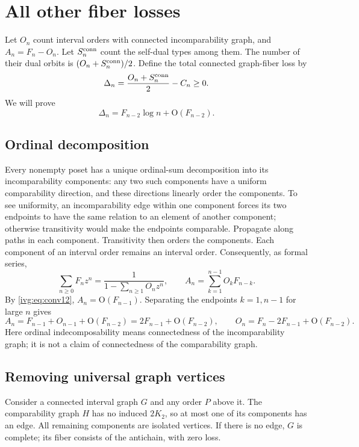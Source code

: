 \documentclass[11pt,letterpaper]{article}
\theoremstyle{definition}\newtheorem{definition}[theorem]{Definition}
\theoremstyle{remark}\newtheorem{remark}[theorem]{Remark}
\newcommand{\OO}{\mathrm O}
\begin{document}
\section{All other fiber losses}\label{ivg:sec:loss}
Let $O_n$ count interval orders with connected incomparability graph, and $A_n=F_n-O_n$. Let $S_n^{\rm conn}$ count the self-dual types among them. The number of their dual orbits is $(O_n+S_n^{\rm conn})/2$. Define the total connected graph-fiber loss by
\begin{equation}\label{ivg:eq:Delta}
 \Delta_n=\frac{O_n+S_n^{\rm conn}}2-C_n\ge0.
\end{equation}
We will prove
\begin{equation}\label{ivg:eq:lossmain}
 \Delta_n=F_{n-2}\log n+\OO(F_{n-2}).
\end{equation}

\subsection{Ordinal decomposition}
Every nonempty poset has a unique ordinal-sum decomposition into its incomparability components: any two such components have a uniform comparability direction, and these directions linearly order the components. To see uniformity, an incomparability edge within one component forces its two endpoints to have the same relation to an element of another component; otherwise transitivity would make the endpoints comparable. Propagate along paths in each component. Transitivity then orders the components. Each component of an interval order remains an interval order. Consequently, as formal series,
\begin{equation}\label{ivg:eq:ordinal}
 \sum_{n\ge0}F_nz^n=\frac1{1-\sum_{n\ge1}O_nz^n},\qquad
 A_n=\sum_{k=1}^{n-1}O_kF_{n-k}.
\end{equation}
By \eqref{ivg:eq:conv12}, $A_n=\OO(F_{n-1})$. Separating the endpoints $k=1,n-1$ for large $n$ gives
\begin{equation}\label{ivg:eq:O}
 A_n=F_{n-1}+O_{n-1}+\OO(F_{n-2})
 =2F_{n-1}+\OO(F_{n-2}),\qquad
 O_n=F_n-2F_{n-1}+\OO(F_{n-2}).
\end{equation}
Here ordinal indecomposability means connectedness of the incomparability graph; it is not a claim of connectedness of the comparability graph.

\subsection{Removing universal graph vertices}
Consider a connected interval graph $G$ and any order $P$ above it. The comparability graph $H$ has no induced $2K_2$, so at most one of its components has an edge. All remaining components are isolated vertices. If there is no edge, $G$ is complete; its fiber consists of the antichain, with zero loss.
\end{document}
